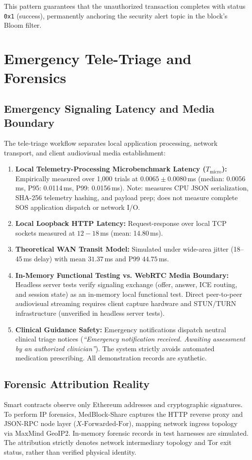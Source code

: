 \documentclass[journal,10pt,twocolumn]{IEEEtran}
\begin{document}
This pattern guarantees that the unauthorized transaction completes with status \texttt{0x1} (success), permanently anchoring the security alert topic in the block's Bloom filter.

\section{Emergency Tele-Triage and Forensics}

\subsection{Emergency Signaling Latency and Media Boundary}
The tele-triage workflow separates local application processing, network transport, and client audiovisual media establishment:
\begin{enumerate}
    \item \textbf{Local Telemetry-Processing Microbenchmark Latency ($T_{\mathrm{micro}}$):} Empirically measured over 1,000 trials at $0.0065 \pm 0.0080$\,ms (median: 0.0056\,ms, P95: 0.0114\,ms, P99: 0.0156\,ms). Note: measures CPU JSON serialization, SHA-256 telemetry hashing, and payload prep; does not measure complete SOS application dispatch or network I/O.
    \item \textbf{Local Loopback HTTP Latency:} Request-response over local TCP sockets measured at $12 - 18$\,ms (mean: 14.80\,ms).
    \item \textbf{Theoretical WAN Transit Model:} Simulated under wide-area jitter (18--45\,ms delay) with mean $31.37$\,ms and P99 $44.75$\,ms.
    \item \textbf{In-Memory Functional Testing vs. WebRTC Media Boundary:} Headless server tests verify signaling exchange (offer, answer, ICE routing, and session state) as an in-memory local functional test. Direct peer-to-peer audiovisual streaming requires client capture hardware and STUN/TURN infrastructure (unverified in headless server tests).
    \item \textbf{Clinical Guidance Safety:} Emergency notifications dispatch neutral clinical triage notices (\emph{``Emergency notification received. Awaiting assessment by an authorized clinician''}). The system strictly avoids automated medication prescribing. All demonstration records are synthetic.
\end{enumerate}

\subsection{Forensic Attribution Reality}
Smart contracts observe only Ethereum addresses and cryptographic signatures. To perform IP forensics, MedBlock-Share captures the HTTP reverse proxy and JSON-RPC node layer ($X\text{-Forwarded-For}$), mapping network ingress topology via MaxMind GeoIP2. In-memory forensic records in test harnesses are simulated. The attribution strictly denotes network intermediary topology and Tor exit status, rather than verified physical identity.
\end{document}
